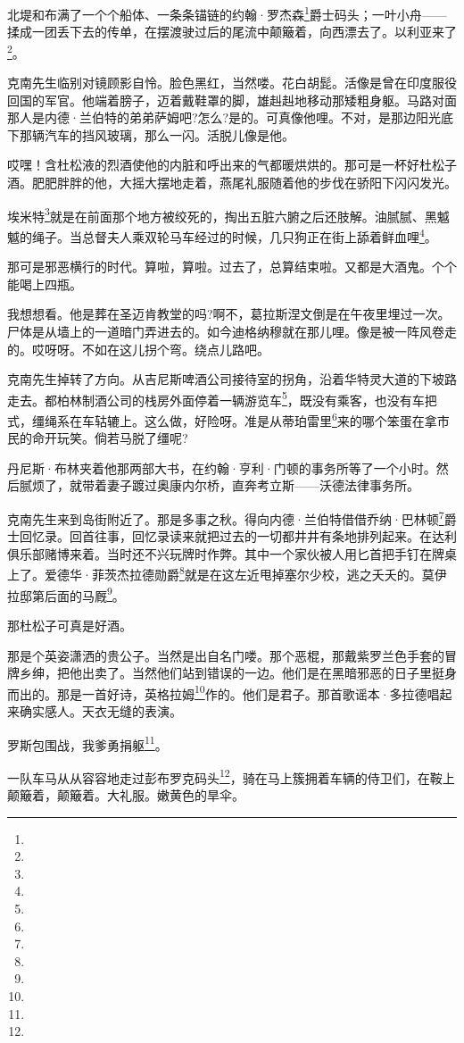 \par 北堤和布满了一个个船体、一条条锚链的约翰·罗杰森\footnote{}爵士码头；一叶小舟——揉成一团丢下去的传单，在摆渡驶过后的尾流中颠簸着，向西漂去了。以利亚来了\footnote{}。
\par 克南先生临别对镜顾影自怜。脸色黑红，当然喽。花白胡髭。活像是曾在印度服役回国的军官。他端着膀子，迈着戴鞋罩的脚，雄赳赳地移动那矮粗身躯。马路对面那人是内德·兰伯特的弟弟萨姆吧?怎么?是的。可真像他哩。不对，是那边阳光底下那辆汽车的挡风玻璃，那么一闪。活脱儿像是他。
\par 哎嘿！含杜松液的烈酒使他的内脏和呼出来的气都暖烘烘的。那可是一杯好杜松子酒。肥肥胖胖的他，大摇大摆地走着，燕尾礼服随着他的步伐在骄阳下闪闪发光。
\par 埃米特\footnote{}就是在前面那个地方被绞死的，掏出五脏六腑之后还肢解。油腻腻、黑魆魆的绳子。当总督夫人乘双轮马车经过的时候，几只狗正在街上舔着鲜血哩\footnote{}。
\par 那可是邪恶横行的时代。算啦，算啦。过去了，总算结束啦。又都是大酒鬼。个个能喝上四瓶。
\par 我想想看。他是葬在圣迈肯教堂的吗?啊不，葛拉斯涅文倒是在午夜里埋过一次。尸体是从墙上的一道暗门弄进去的。如今迪格纳穆就在那儿哩。像是被一阵风卷走的。哎呀呀。不如在这儿拐个弯。绕点儿路吧。
\par 克南先生掉转了方向。从吉尼斯啤酒公司接待室的拐角，沿着华特灵大道的下坡路走去。都柏林制酒公司的栈房外面停着一辆游览车\footnote{}，既没有乘客，也没有车把式，缰绳系在车轱辘上。这么做，好险呀。准是从蒂珀雷里\footnote{}来的哪个笨蛋在拿市民的命开玩笑。倘若马脱了缰呢?
\par 丹尼斯·布林夹着他那两部大书，在约翰·亨利·门顿的事务所等了一个小时。然后腻烦了，就带着妻子踱过奥康内尔桥，直奔考立斯——沃德法律事务所。
\par 克南先生来到岛街附近了。那是多事之秋。得向内德·兰伯特借借乔纳·巴林顿\footnote{}爵士回忆录。回首往事，回忆录读来就把过去的一切都井井有条地排列起来。在达利俱乐部赌博来着。当时还不兴玩牌时作弊。其中一个家伙被人用匕首把手钉在牌桌上了。爱德华·菲茨杰拉德勋爵\footnote{}就是在这左近甩掉塞尔少校，逃之夭夭的。莫伊拉邸第后面的马厩\footnote{}。
\par 那杜松子可真是好酒。
\par 那是个英姿潇洒的贵公子。当然是出自名门喽。那个恶棍，那戴紫罗兰色手套的冒牌乡绅，把他出卖了。当然他们站到错误的一边。他们是在黑暗邪恶的日子里挺身而出的。那是一首好诗，英格拉姆\footnote{}作的。他们是君子。那首歌谣本·多拉德唱起来确实感人。天衣无缝的表演。
\par 罗斯包围战，我爹勇捐躯\footnote{}。
\par 一队车马从从容容地走过彭布罗克码头\footnote{}，骑在马上簇拥着车辆的侍卫们，在鞍上颠簸着，颠簸着。大礼服。嫩黄色的旱伞。
